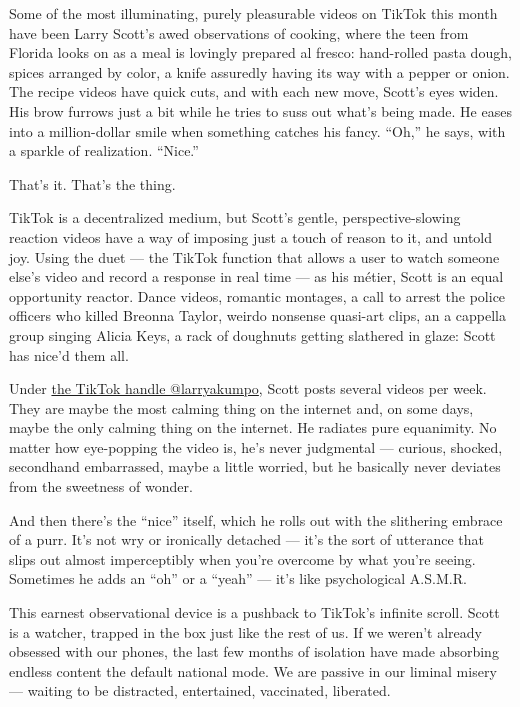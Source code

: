 Some of the most illuminating, purely pleasurable videos on TikTok this
month have been Larry Scott's awed observations of cooking, where the
teen from Florida looks on as a meal is lovingly prepared al fresco:
hand-rolled pasta dough, spices arranged by color, a knife assuredly
having its way with a pepper or onion. The recipe videos have quick
cuts, and with each new move, Scott's eyes widen. His brow furrows just
a bit while he tries to suss out what's being made. He eases into a
million-dollar smile when something catches his fancy. ``Oh,'' he says,
with a sparkle of realization. ``Nice.''

That's it. That's the thing.

TikTok is a decentralized medium, but Scott's gentle,
perspective-slowing reaction videos have a way of imposing just a touch
of reason to it, and untold joy. Using the duet --- the TikTok function
that allows a user to watch someone else's video and record a response
in real time --- as his métier, Scott is an equal opportunity reactor.
Dance videos, romantic montages, a call to arrest the police officers
who killed Breonna Taylor, weirdo nonsense quasi-art clips, an a
cappella group singing Alicia Keys, a rack of doughnuts getting
slathered in glaze: Scott has nice'd them all.

Under \href{https://www.tiktok.com/@larryakumpo}{the TikTok handle
@larryakumpo}, Scott posts several videos per week. They are maybe the
most calming thing on the internet and, on some days, maybe the only
calming thing on the internet. He radiates pure equanimity. No matter
how eye-popping the video is, he's never judgmental --- curious,
shocked, secondhand embarrassed, maybe a little worried, but he
basically never deviates from the sweetness of wonder.

And then there's the ``nice'' itself, which he rolls out with the
slithering embrace of a purr. It's not wry or ironically detached ---
it's the sort of utterance that slips out almost imperceptibly when
you're overcome by what you're seeing. Sometimes he adds an ``oh'' or a
``yeah'' --- it's like psychological A.S.M.R.

This earnest observational device is a pushback to TikTok's infinite
scroll. Scott is a watcher, trapped in the box just like the rest of us.
If we weren't already obsessed with our phones, the last few months of
isolation have made absorbing endless content the default national mode.
We are passive in our liminal misery --- waiting to be distracted,
entertained, vaccinated, liberated.

